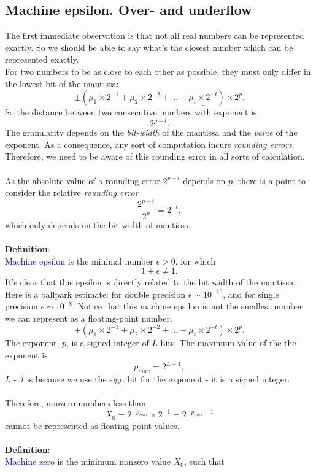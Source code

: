 \documentclass{article}
\begin{document}
\subsection{Machine epsilon. Over- and underflow}

The first immediate observation is that not all real numbers can be represented exactly. So we should be able to say what's the closest number which can be represented exactly.\\
For two numbers to be as close to each other as possible, they must only differ in the \underline{lowest bit} of the mantissa:
\[
\pm(\mu_1\times2^{-1}+\mu_2\times2^{-2}+...+\underline{\mu_t\times2^{-t}})\times2^{p}.
\]
So the distance between two consecutive numbers with exponent is
\[
2^{p-t}.
\]
The granularity depends on the {\it bit-width} of the mantissa and the {\it value} of the exponent. As a consequence, any sort of computation incurs {\it rounding errors}. Therefore, we need to be aware of this rounding error in all sorts of calculation.\\
\\As the absolute value of a rounding error $2^{p-t}$ depends on $p$, there is a point to consider the relative {\it rounding error}
\[
\frac{2^{p-t}}{2^p}=2^{-t},
\]
which only depends on the bit width of mantissa.\\
\\{\bf Definition}:\\
\textcolor{blue}{Machine epsilon} is the minimal number $\epsilon>0$, for which
\[
1+\epsilon\neq 1.
\]
It's clear that this epsilon is directly related to the bit width of the mantissa. Here is a ballpark estimate: for double precision $\epsilon\sim10^{-16}$, and for single precision $\epsilon\sim10^{-8}$. Notice that this machine epsilon is not the smallest number we can represent as a floating-point number.\\
\[
\pm(\mu_1\times2^{-1}+\mu_2\times2^{-2}+...+\mu_t\times2^{-t})\times2^{p}.
\]
The exponent, $p$, is a signed integer of $L$ bits. The maximum value of the the exponent is
\[
p_{max}=2^{L-1},
\]
{\it L - 1} is because we use the sign bit for the exponent - it is a signed integer.\\
\\Therefore, nonzero numbers less than
\[
X_0=2^{-p_{max}}\times 2^{-1}=2^{-p_{max}-1}
\]
cannot be represented as floating-point values.\\
\\{\bf Definition}:\\
\textcolor{blue}{Machine zero} is the minimum nonzero value $X_0$, such that
\end{document}
